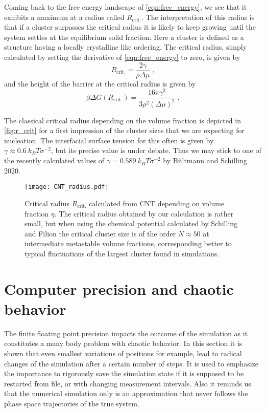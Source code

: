 Coming back to the free energy landscape of \autoref{eqn:free_energy}, we see that it exhibits a maximum at a radius called $R_{\text{crit.}}$. The interpretation of this radius is that if a cluster surpasses the critical radius it is likely to keep growing until the system settles at the equilibrium solid fraction. Here a cluster is defined as a structure having a locally crystalline like ordering. The critical radius, simply calculated by setting the derivative of \autoref{eqn:free_energy} to zero, is given by
\begin{equation}
\label{eqn:r_crit}
R_{\text{crit.}} = \frac{2 \gamma}{\rho \Delta \mu } \; \text{,}
\end{equation}
and the height of the barrier at the critical radius is given by
\begin{equation}
\beta \Delta G (R_{\text{crit.}}) = \frac{16 \pi \gamma^3}{3 \rho^2 (\Delta \mu )^2} \; \text{.}
\end{equation}

The classical critical radius depending on the volume fraction is depicted in \autoref{fig:r_crit} for a first impression of the cluster sizes that we are expecting for nucleation. The interfacial surface tension for this often is given by $\gamma \approx \SI{0.6}{k_B T \sigma^{-2}}$, but its precise value is under debate. Thus we may stick to one of the recently calculated values of $\gamma = \SI{0.589}{k_B T \sigma^{-2}}$ by Bültmann and Schilling 2020\cite{Bultmann2020}. 
\begin{figure}[h]
\centering
\texttt{[image: CNT\_radius.pdf]}
\caption[Critical radius in the metastable regime]{Critical radius $R_{\text{crit.}}$ calculated from CNT depending on volume fraction $\eta$. The critical radius obtained by our calculation is rather small, but when using the chemical potential calculated by Schilling and Filion the critical cluster size is of the order $N \approx 50$ at intermediate metastable volume fractions, corresponding better to typical fluctuations of the largest cluster found in simulations.}
\label{fig:r_crit}
\end{figure}

\section{Computer precision and chaotic behavior}
\label{sec:precision}
The finite floating point precision impacts the outcome of the simulation as it constitutes a many body problem with chaotic behavior. In this section it is shown that even smallest variations of positions for example, lead to radical changes of the simulation after a certain number of steps. It is used to emphasize the importance to rigorously save the simulation state if it is supposed to be restarted from file, or with changing measurement intervals. Also it reminds us that the numerical simulation only is an approximation that never follows the phase space trajectories of the true system.\\

